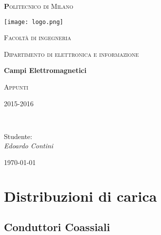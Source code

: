 \documentclass[10pt,a4paper]{report}
\begin{document}
\begin{titlepage}

	\centering
	{\scshape\huge\textbf Politecnico di Milano \par}
	\vspace{0.5cm}

	\texttt{[image: logo.png]}\par\vspace{0.2cm}
	
	{\scshape\small Facoltà di ingegneria\par}
	{\scshape\small Dipartimento di elettronica e informazione\par}
	\vspace{1.5cm}
	{\huge\bfseries Campi Elettromagnetici\par}
	\vspace{1.5cm}
	{\scshape Appunti\par}
	{\scshape\small 2015-2016 \par}
	\vspace{2cm}
	\vfill
    \\[1cm]
	
	\raggedright
    {Studente:\\ \textit{Edoardo Contini}
	
	}\vfill
	\raggedleft
	{\large \today\par}
	
	\end{titlepage}

	



\tableofcontents
{}

\chapter{Distribuzioni di carica}

	\section{Conduttori Coassiali}
\end{document}

